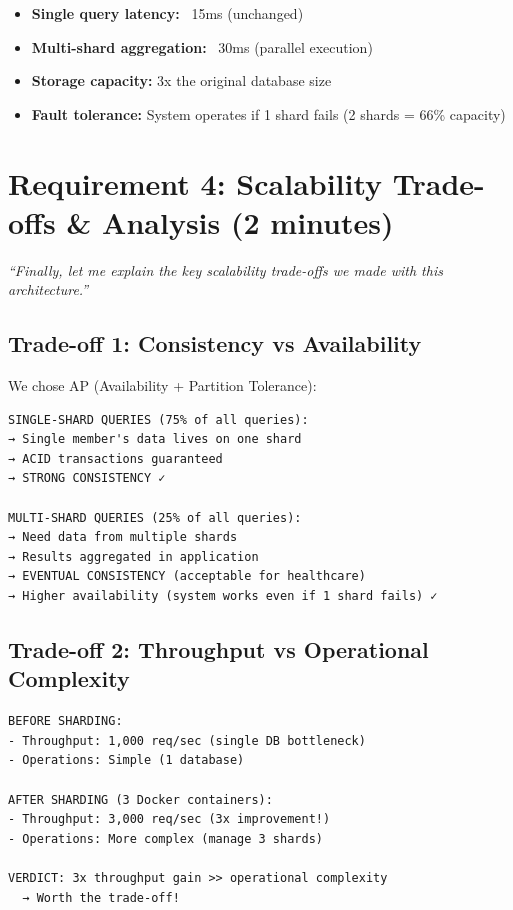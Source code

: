 \documentclass[12pt]{article}
\begin{document}
\begin{itemize}
    \item \textbf{Single query latency:} ~15ms (unchanged)
    \item \textbf{Multi-shard aggregation:} ~30ms (parallel execution)
    \item \textbf{Storage capacity:} 3x the original database size
    \item \textbf{Fault tolerance:} System operates if 1 shard fails (2 shards = 66\% capacity)
\end{itemize}

\newpage

\section{Requirement 4: Scalability Trade-offs \& Analysis (2 minutes)}

\textit{``Finally, let me explain the key scalability trade-offs we made with this architecture.''}

\subsection*{Trade-off 1: Consistency vs Availability}

We chose AP (Availability + Partition Tolerance):

\begin{lstlisting}
SINGLE-SHARD QUERIES (75% of all queries):
→ Single member's data lives on one shard
→ ACID transactions guaranteed
→ STRONG CONSISTENCY ✓

MULTI-SHARD QUERIES (25% of all queries):
→ Need data from multiple shards
→ Results aggregated in application
→ EVENTUAL CONSISTENCY (acceptable for healthcare)
→ Higher availability (system works even if 1 shard fails) ✓
\end{lstlisting}

\subsection*{Trade-off 2: Throughput vs Operational Complexity}

\begin{lstlisting}
BEFORE SHARDING:
- Throughput: 1,000 req/sec (single DB bottleneck)
- Operations: Simple (1 database)

AFTER SHARDING (3 Docker containers):
- Throughput: 3,000 req/sec (3x improvement!)
- Operations: More complex (manage 3 shards)

VERDICT: 3x throughput gain >> operational complexity
  → Worth the trade-off!
\end{lstlisting}
\end{document}

